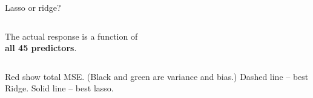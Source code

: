 \documentclass[mathserif, handout, aspectratio=169]{beamer}
\begin{document}
\begin{frame}{Lasso or ridge?}
\begin{columns}
\begin{center}
The actual response is a function of\\ \textbf{all 45 predictors}.  
\end{center}  


\end{columns}

\vspace{5mm}
\footnotesize Red show total MSE.  (Black and green are variance and bias.) 
Dashed line -- best Ridge.  Solid line -- best lasso.  
\end{frame}
\end{document}

